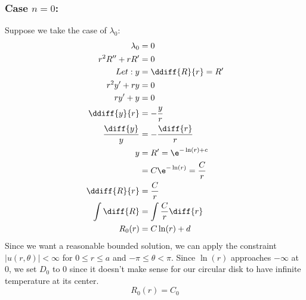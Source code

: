 \documentclass{math}
\begin{document}
\subsubsection*{Case \( n = 0 \):}
Suppose we take the case of
\( \lambda_0 \):
\begin{align*}
  \lambda_0 &= 0 \\
  r^2R''+rR' &= 0 \\
  Let: y &= \ddiff{R}{r} = R' \\
  r^2y'+ry &= 0 \\
  ry'+y &= 0 \\
  \ddiff{y}{r} &= -\frac{y}{r} \\
  \frac{\diff{y}}{y} &= -\frac{\diff{r}}{r} \\
  y &= R' = \e^{-\ln(r)+c} \\
  &= C\e^{-\ln(r)} = \frac{C}{r} \\
  \ddiff{R}{r} &= \frac{C}{r} \\
  \int\diff{R} &= \int\frac{C}{r}\diff{r} \\
  R_0(r) &= C\ln(r)+d
\end{align*}
Since we want a reasonable bounded solution, we can apply the constraint
\( |u(r,\theta)| < \infty \) for \( 0\le r\le a \) and \( -\pi\le\theta<\pi \).
Since \( \ln(r) \) approaches \( -\infty \) at 0, we set \( D_0 \) to 0 since
it doesn't make sense for our circular disk to have infinite temperature at
its center.
\[ R_0(r) = C_0 \]
\end{document}
